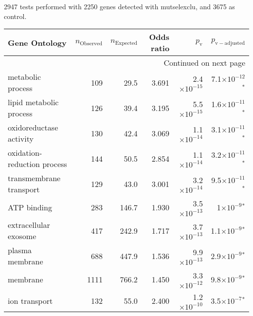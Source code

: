 2947 tests performed with 2250 genes detected with mutselexclu, and 3675 as control.\scriptsize
\begin{longtable}{|l|r|r|r|r|r|}
\toprule
                                     Gene Ontology & $n_{\mathrm{Observed}}$ & $n_{\mathrm{Expected}}$ & Odds ratio &     $p_{\mathrm{v}}$ &      $p_{\mathrm{v-adjusted}}$ \\
\midrule
\endhead
\midrule
\multicolumn{6}{r}{{Continued on next page}} \\
\midrule
\endfoot

\bottomrule
\endlastfoot
                                 metabolic process &                     109 &                    29.5 &      3.691 & 2.4$\times 10^{-15}$ &  7.1$\times 10^{-12}$$\bm{^*}$ \\
                           lipid metabolic process &                     126 &                    39.4 &      3.195 & 5.5$\times 10^{-15}$ &  1.6$\times 10^{-11}$$\bm{^*}$ \\
                           oxidoreductase activity &                     130 &                    42.4 &      3.069 & 1.1$\times 10^{-14}$ &  3.1$\times 10^{-11}$$\bm{^*}$ \\
                       oxidation-reduction process &                     144 &                    50.5 &      2.854 & 1.1$\times 10^{-14}$ &  3.2$\times 10^{-11}$$\bm{^*}$ \\
                           transmembrane transport &                     129 &                    43.0 &      3.001 & 3.2$\times 10^{-14}$ &  9.5$\times 10^{-11}$$\bm{^*}$ \\
                                       ATP binding &                     283 &                   146.7 &      1.930 & 3.5$\times 10^{-13}$ &     1$\times 10^{-9}$$\bm{^*}$ \\
                             extracellular exosome &                     417 &                   242.9 &      1.717 & 3.7$\times 10^{-13}$ &   1.1$\times 10^{-9}$$\bm{^*}$ \\
                                   plasma membrane &                     688 &                   447.9 &      1.536 & 9.9$\times 10^{-13}$ &   2.9$\times 10^{-9}$$\bm{^*}$ \\
                                          membrane &                    1111 &                   766.2 &      1.450 & 3.3$\times 10^{-12}$ &   9.8$\times 10^{-9}$$\bm{^*}$ \\
                                     ion transport &                     132 &                    55.0 &      2.400 & 1.2$\times 10^{-10}$ &   3.5$\times 10^{-7}$$\bm{^*}$ \\

\end{longtable}
